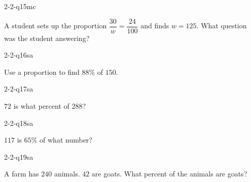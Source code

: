 \begin{practiceQuestion}{2-2-q15}{mc}
\begin{questionText}
A student sets up the proportion $\dfrac{30}{w} = \dfrac{24}{100}$ and finds $w = 125$. What question was the student answering?
\end{questionText}
\end{practiceQuestion}


\begin{practiceQuestion}{2-2-q16}{sa}
\begin{questionText}
Use a proportion to find $88\%$ of $150$.
\end{questionText}
\end{practiceQuestion}

\begin{practiceQuestion}{2-2-q17}{sa}
\begin{questionText}
$72$ is what percent of $288$?
\end{questionText}
\end{practiceQuestion}

\begin{practiceQuestion}{2-2-q18}{sa}
\begin{questionText}
$117$ is $65\%$ of what number?
\end{questionText}
\end{practiceQuestion}

\begin{practiceQuestion}{2-2-q19}{sa}
\begin{questionText}
A farm has $240$ animals. $42$ are goats. What percent of the animals are goats?
\end{questionText}
\end{practiceQuestion}

